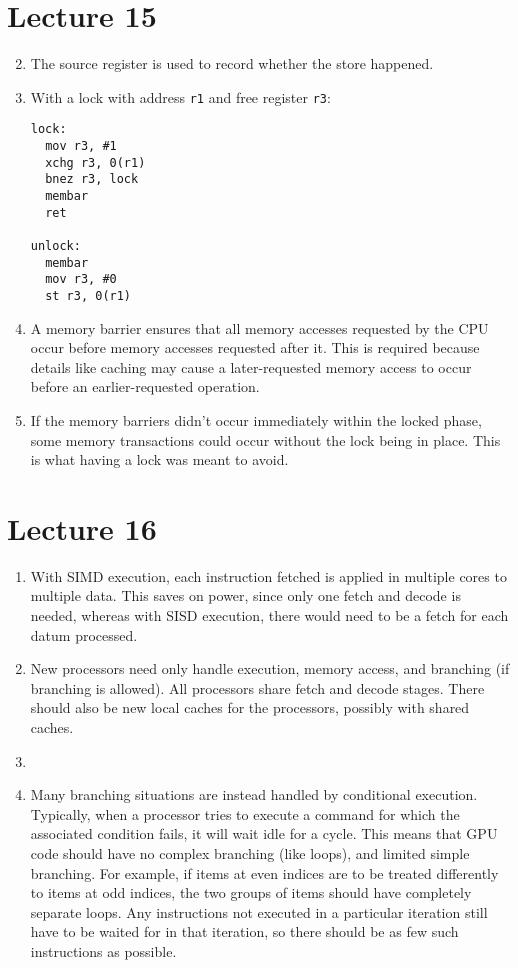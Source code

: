 \documentclass{article}
\begin{document}
\section{Lecture 15}
\begin{enumerate}
\setcounter{enumi}{1}
  \item The source register is used to record whether the store happened.
  \item With a lock with address \texttt{r1} and free register \texttt{r3}:
    \begin{lstlisting}
lock:
  mov r3, #1
  xchg r3, 0(r1)
  bnez r3, lock
  membar
  ret

unlock:
  membar
  mov r3, #0
  st r3, 0(r1)
    \end{lstlisting}
\setcounter{enumi}{5}
  \item A memory barrier ensures that all memory accesses requested by the CPU occur before memory accesses requested after it. This is required because details like caching may cause a later-requested memory access to occur before an earlier-requested operation.
  \item If the memory barriers didn't occur immediately within the locked phase, some memory transactions could occur without the lock being in place. This is what having a lock was meant to avoid.
\end{enumerate}

\section{Lecture 16}
\begin{enumerate}
  \item With SIMD execution, each instruction fetched is applied in multiple cores to multiple data. This saves on power, since only one fetch and decode is needed, whereas with SISD execution, there would need to be a fetch for each datum processed.
  \item New processors need only handle execution, memory access, and branching (if branching is allowed). All processors share fetch and decode stages. There should also be new local caches for the processors, possibly with shared caches.
  \item 
  \item Many branching situations are instead handled by conditional execution. Typically, when a processor tries to execute a command for which the associated condition fails, it will wait idle for a cycle. This means that GPU code should have no complex branching (like loops), and limited simple branching. For example, if items at even indices are to be treated differently to items at odd indices, the two groups of items should have completely separate loops. Any instructions not executed in a particular iteration still have to be waited for in that iteration, so there should be as few such instructions as possible.
\end{enumerate}
\end{document}

